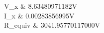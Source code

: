 V_x & 8.63480971182V \\ \hline 
I_x & 0.00283856995V \\ \hline 
R_{equiv} & 3041.95770117000V \\ \hline 
